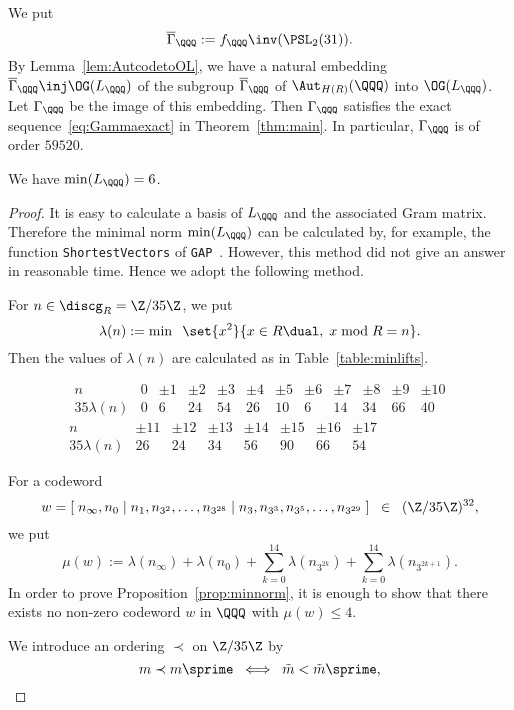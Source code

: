 \documentclass{amsart}
\begin{document}
We put
$$
\overline{\Gamma}_{\QQQ}:= f_{\QQQ}\inv (\PSL_2(31)).
$$
By Lemma~\ref{lem:AutcodetoOL}, 
we have a natural embedding $\overline{\Gamma}_{\QQQ}\inj \OG(L_{\QQQ})$
of the subgroup $\overline{\Gamma}_{\QQQ}$ of $\Aut_{H(R)}(\QQQ)$ into $\OG(L_{\QQQ})$.
Let $\Gamma_{\QQQ}$ be the image of this embedding.
Then   $\Gamma_{\QQQ}$ satisfies the exact sequence~\eqref{eq:Gammaexact} in Theorem~\ref{thm:main}.
In particular, $\Gamma_{\QQQ}$ is of order $59520$.
%
\begin{proposition}\label{prop:minnorm}
We have $\min(L_{\QQQ})=6$.
\end{proposition}
%
\begin{proof}
It is easy to calculate a basis of $L_{\QQQ}$ 
and the associated Gram matrix.
Therefore the minimal norm $\min (L_{\QQQ})$ can  be  calculated by,
for example, the function {\tt ShortestVectors} of {\tt GAP}~\cite{GAP}.
However, this method did not give an answer in reasonable time.
Hence 
we adopt the following method.
\par
For $n\in \discg_R= \Z/35\Z$, we put
$$
\lambda(n):=\min \;\;\set{x^2}{ x\in R\dual, \;x \bmod R=n}.
$$
Then the values of $\lambda(n)$ are calculated as in Table~\ref{table:minlifts}.
%
\begin{table}
$$
\begin{array}{c|cccccccccccc}
n & 0 & \pm1 & \pm 2 & \pm 3 & \pm 4 &\pm 5 & \pm 6 &\pm 7 &\pm 8 & \pm 9 & \pm 10 \\
\hline
35 \lambda (n) & 0 & 6 & 24 & 54 & 26 & 10 & 6 & 14 & 34 & 66  & 40 
\end{array}
$$
$$
\begin{array}{c|ccccccc}
n & \pm 11 & \pm12 & \pm 13 & \pm 14 & \pm 15 &\pm 16 & \pm 17 \\
\hline
35 \lambda (n) & 26 & 24 & 34 & 56 & 90 & 66 & 54  
\end{array}\phantom{aaaaaaaaa\,\,\,}
$$
\caption{$\lambda (n)$}\label{table:minlifts}
\end{table}
%
For a codeword
$$
w=[\;n_{\infty}, n_{0}\; |\; n_{1}, n_{3^2}, \dots, n_{3^{28}} \; |\;  n_{3}, n_{3^3},  n_{3^5}, \dots, n_{3^{29}}\;]\;\;\in\;\;  (\Z/35\Z)^{32},
$$
we put
$$
\mu(w):=\lambda(n_{\infty})+\lambda(n_{0})+\sum_{k=0}^{14}\lambda(n_{3^{2k}})+\sum_{k=0}^{14}\lambda(n_{3^{2k+1}}).
$$
In order to prove Proposition~\ref{prop:minnorm},
it is enough to show that there exists no non-zero codeword $w$ in $\QQQ$ with $\mu(w)\le 4$.
\par
We introduce an ordering $\prec$ on $\Z/35\Z$ by
$$
m\prec m\sprime\;\; \Longleftrightarrow\;\; \tilde{m}<\tilde{m}\sprime,
$$
\end{proof}
\end{document}
